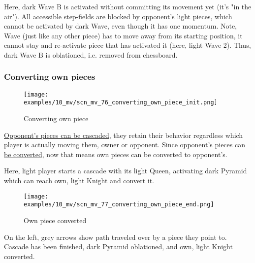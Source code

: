Here, dark Wave B is activated without committing its movement yet (it's "in the air").
All accessible step-fields are blocked by opponent's light pieces, which cannot be
activated by dark Wave, even though it has one momentum.
Note, Wave (just like any other piece) has to move away from its starting position,
it cannot stay and re-activate piece that has activated it (here, light Wave 2).
Thus, dark Wave B is oblationed, i.e. removed from chessboard.

\clearpage %

\subsubsection*{Converting own pieces}
\label{sec:Miranda's veil/Wave/Cascading opponent/Converting own pieces}

\vspace*{-0.7\baselineskip}
\noindent
\begin{wrapfigure}[11]{l}{0.4\textwidth}
\centering
\texttt{[image: examples/10\_mv/scn\_mv\_76\_converting\_own\_piece\_init.png]}
\vspace*{-1.4\baselineskip}
\caption{Converting own piece}
\label{fig:scn_mv_76_converting_own_piece_init}
\end{wrapfigure}
\hyperref[fig:scn_mv_65_wave_cascading_opponent]{Opponent's pieces can be cascaded},
they retain their behavior regardless which player is actually moving them, owner
or opponent.\newline
Since
\hyperref[sec:Mayan Ascendancy/Pyramid/Conversion]{opponent's pieces can be converted},
now that means own pieces can be converted to opponent's.

Here, light player starts a cascade with its light Queen, activating dark Pyramid
which can reach own, light Knight and convert it.

\vspace*{0.7\baselineskip}
\noindent
\begin{wrapfigure}[14]{l}{0.4\textwidth}
\centering
\texttt{[image: examples/10\_mv/scn\_mv\_77\_converting\_own\_piece\_end.png]}
\vspace*{-1.4\baselineskip}
\caption{Own piece converted}
\label{fig:scn_mv_77_converting_own_piece_end}
\end{wrapfigure}
On the left, grey arrows show path traveled over by a piece they point to.
Cascade has been finished, dark Pyramid oblationed, and own, light Knight
converted.

